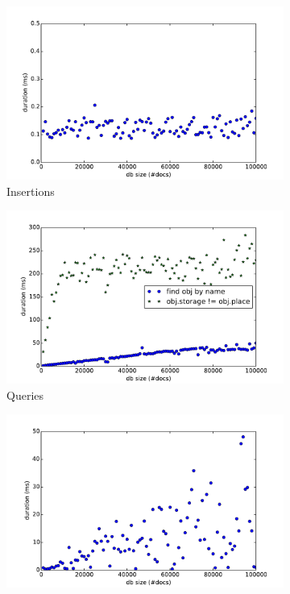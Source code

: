 \begin{figure}[ht!]
  \centering
  \begin{subfigure}[b]{0.49\textwidth}
    \hspace{-8mm}
    \includegraphics[width=1.15\textwidth]{plots/insert-durations}
    \caption{Insertions}
    \label{fig:insert-durations}
  \end{subfigure}
  \begin{subfigure}[b]{0.49\textwidth}
    \hspace{-3mm}
    \includegraphics[width=1.15\textwidth]{plots/query-durations}
    \caption{Queries}
    \label{fig:query-durations}
  \end{subfigure}
  \begin{subfigure}[b]{0.49\textwidth}
    \hspace{-8mm}
    \includegraphics[width=1.15\textwidth]{plots/update-durations}

\end{subfigure}
\end{figure}
